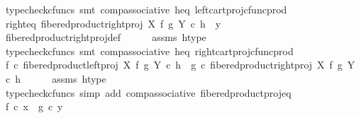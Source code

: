 \begin{isabellebody}
\ {\isacharparenleft}{\kern0pt}typecheck{\isacharunderscore}{\kern0pt}cfuncs{\isacharcomma}{\kern0pt}\ smt\ comp{\isacharunderscore}{\kern0pt}associative{}\ h{\isacharunderscore}{\kern0pt}eq\ left{\isacharunderscore}{\kern0pt}cart{\isacharunderscore}{\kern0pt}proj{\isacharunderscore}{\kern0pt}cfunc{\isacharunderscore}{\kern0pt}prod{\isacharparenright}{\kern0pt}\isanewline
\isanewline
\ \ \isamarkupfalse%
\ right{\isacharunderscore}{\kern0pt}eq{\isacharcolon}{\kern0pt}\ {\isachardoublequoteopen}fibered{\isacharunderscore}{\kern0pt}product{\isacharunderscore}{\kern0pt}right{\isacharunderscore}{\kern0pt}proj\ X\ f\ g\ Y\ {\isasymcirc}\isactrlsub c\ h\ {\isacharequal}{\kern0pt}\ y{\isachardoublequoteclose}\isanewline
\ \ \ \ \isamarkupfalse%
\ fibered{\isacharunderscore}{\kern0pt}product{\isacharunderscore}{\kern0pt}right{\isacharunderscore}{\kern0pt}proj{\isacharunderscore}{\kern0pt}def\isanewline
\ \ \ \ \isamarkupfalse%
\ assms\ h{\isacharunderscore}{\kern0pt}type\isanewline
\ \ \ \ \isamarkupfalse%
\ {\isacharparenleft}{\kern0pt}typecheck{\isacharunderscore}{\kern0pt}cfuncs{\isacharcomma}{\kern0pt}\ smt\ comp{\isacharunderscore}{\kern0pt}associative{}\ h{\isacharunderscore}{\kern0pt}eq\ right{\isacharunderscore}{\kern0pt}cart{\isacharunderscore}{\kern0pt}proj{\isacharunderscore}{\kern0pt}cfunc{\isacharunderscore}{\kern0pt}prod{\isacharparenright}{\kern0pt}\isanewline
\isanewline
\ \ \isamarkupfalse%
\ {\isachardoublequoteopen}f\ {\isasymcirc}\isactrlsub c\ fibered{\isacharunderscore}{\kern0pt}product{\isacharunderscore}{\kern0pt}left{\isacharunderscore}{\kern0pt}proj\ X\ f\ g\ Y\ {\isasymcirc}\isactrlsub c\ h\ {\isacharequal}{\kern0pt}\ g\ {\isasymcirc}\isactrlsub c\ fibered{\isacharunderscore}{\kern0pt}product{\isacharunderscore}{\kern0pt}right{\isacharunderscore}{\kern0pt}proj\ X\ f\ g\ Y\ {\isasymcirc}\isactrlsub c\ h{\isachardoublequoteclose}\isanewline
\ \ \ \ \isamarkupfalse%
\ assms\ h{\isacharunderscore}{\kern0pt}type\ \isamarkupfalse%
\ {\isacharparenleft}{\kern0pt}typecheck{\isacharunderscore}{\kern0pt}cfuncs{\isacharcomma}{\kern0pt}\ simp\ add{\isacharcolon}{\kern0pt}\ comp{\isacharunderscore}{\kern0pt}associative{}\ fibered{\isacharunderscore}{\kern0pt}product{\isacharunderscore}{\kern0pt}proj{\isacharunderscore}{\kern0pt}eq{\isacharparenright}{\kern0pt}\isanewline
\ \ \isamarkupfalse%
\ \isamarkupfalse%
\ {\isachardoublequoteopen}f\ {\isasymcirc}\isactrlsub c\ x\ {\isacharequal}{\kern0pt}\ g\ {\isasymcirc}\isactrlsub c\ y{\isachardoublequoteclose}\isanewline

\end{isabellebody}

